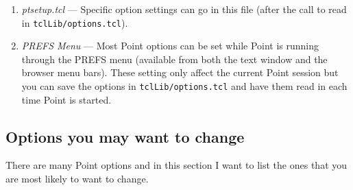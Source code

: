 \begin{enumerate}
\item {\it ptsetup.tcl} ---
Specific option settings can go in this file (after the call
to read in {\tt tclLib/options.tcl}).

\item {\it PREFS Menu} ---
Most Point options can be set while Point is running through the
PREFS menu (available from both the text window and the browser
menu bars).
These setting only affect the current Point session but you can
save the options in {\tt tclLib/options.tcl} and have them
read in each time Point is started.

\end{enumerate}



\subsection{Options you may want to change}

There are many Point options and in this section I want to list the ones
that you are most likely to want to change.

